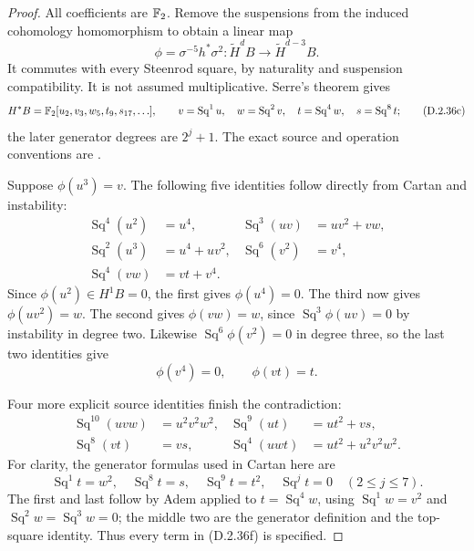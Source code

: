 \begin{proof}
All coefficients are $\mathbb F_2$. Remove the suspensions from
the induced cohomology homomorphism to obtain a linear map
\[
 \phi=\sigma^{-5}h^*\sigma^2:
 \widetilde H^dB\longrightarrow\widetilde H^{d-3}B.
                   \tag{D.2.36b}
\]
It commutes with every Steenrod square, by naturality and
suspension compatibility. It is not assumed multiplicative.
Serre's theorem gives
\[
 H^*B=\mathbb F_2[u_2,v_3,w_5,t_9,s_{17},\ldots],\qquad
 v=\operatorname{Sq}^1u,\quad w=\operatorname{Sq}^2v,
 \quad t=\operatorname{Sq}^4w,\quad s=\operatorname{Sq}^8t;
                   \tag{D.2.36c}
\]
the later generator degrees are $2^j+1$. The exact source
and operation conventions are
\cite[\S1, nos.~2.1--2.4; \S2, no.~8, Theorem~2,
and no.~9, pp.~199, 203--204]{I_Serre1953}.

Suppose $\phi(u^3)=v$. The following five identities follow
directly from Cartan and instability:
\[
\begin{aligned}
 \operatorname{Sq}^4(u^2)&=u^4,&
 \operatorname{Sq}^3(uv)&=uv^2+vw,\\
 \operatorname{Sq}^2(u^3)&=u^4+uv^2,&
 \operatorname{Sq}^6(v^2)&=v^4,\\
 \operatorname{Sq}^4(vw)&=vt+v^4.
\end{aligned}
                   \tag{D.2.36d}
\]
Since $\phi(u^2)\in H^1B=0$, the first gives
$\phi(u^4)=0$. The third now gives $\phi(uv^2)=w$.
The second gives $\phi(vw)=w$, since
$\operatorname{Sq}^3\phi(uv)=0$ by instability in degree two.
Likewise $\operatorname{Sq}^6\phi(v^2)=0$ in degree three,
so the last two identities give
\[
                       \phi(v^4)=0,\qquad \phi(vt)=t.
                       \tag{D.2.36e}
\]

Four more explicit source identities finish the contradiction:
\[
\begin{aligned}
 \operatorname{Sq}^{10}(uvw)&=u^2v^2w^2,&
 \operatorname{Sq}^9(ut)&=ut^2+vs,\\
 \operatorname{Sq}^8(vt)&=vs,&
 \operatorname{Sq}^4(uwt)&=ut^2+u^2v^2w^2.
\end{aligned}
                       \tag{D.2.36f}
\]
For clarity, the generator formulas used in Cartan here are
\[
 \operatorname{Sq}^1t=w^2,\quad
 \operatorname{Sq}^8t=s,\quad
 \operatorname{Sq}^9t=t^2,\quad
 \operatorname{Sq}^jt=0\quad(2\leq j\leq7).
                       \tag{D.2.36g}
\]
The first and last follow by Adem applied to $t=\operatorname{Sq}^4w$,
using $\operatorname{Sq}^1w=v^2$ and
$\operatorname{Sq}^2w=\operatorname{Sq}^3w=0$;
the middle two are the generator definition and the top-square
identity. Thus every term in \textup{(D.2.36f)} is specified.


\end{proof}
